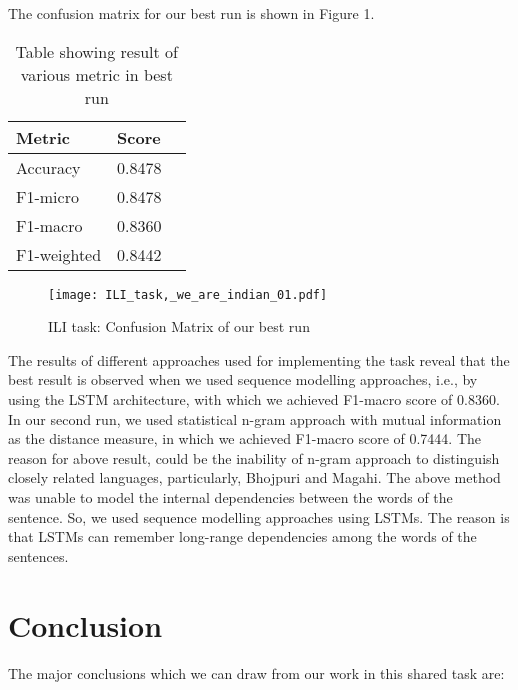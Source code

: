 \documentclass[11pt]{article}
\begin{document}
The confusion matrix for our best run is shown in Figure 1. 

\begin{table}[!]
\begin{center}
\begin{tabular}{|l|l|l|}  \hline
\textbf{Metric} & \textbf{Score} \\ \hline
Accuracy & 0.8478 \\ \hline
F1-micro & 0.8478 \\ \hline
F1-macro & 0.8360 \\ \hline
F1-weighted & 0.8442\\ \hline

\end{tabular}\label{cht2}
\end{center}
\caption{Table showing result of various metric in best run}
\end{table}
 \vskip 2in


\begin{figure*}
\centering
\texttt{[image: ILI\_task,\_we\_are\_indian\_01.pdf]}
\caption{ILI task: Confusion Matrix of our best run}
\label{fig:1}
\end{figure*}

The results of different approaches used for implementing the task reveal that the best result is observed when we used sequence modelling approaches, i.e., by using the LSTM architecture, with which we achieved F1-macro score of 0.8360. In our second run, we used statistical n-gram approach with mutual information \cite{zamora2014tweets} as the distance measure, in which we achieved F1-macro score of 0.7444. The reason for above result, could be the inability of n-gram approach to distinguish closely related languages, particularly, Bhojpuri and Magahi. The above method was unable to model the internal dependencies between the words of the sentence. So, we used sequence modelling approaches using LSTMs. The reason is that LSTMs can remember long-range dependencies among the words of the sentences.

\section{Conclusion}

The major conclusions which we can draw from our work in this shared task are:
\end{document}
